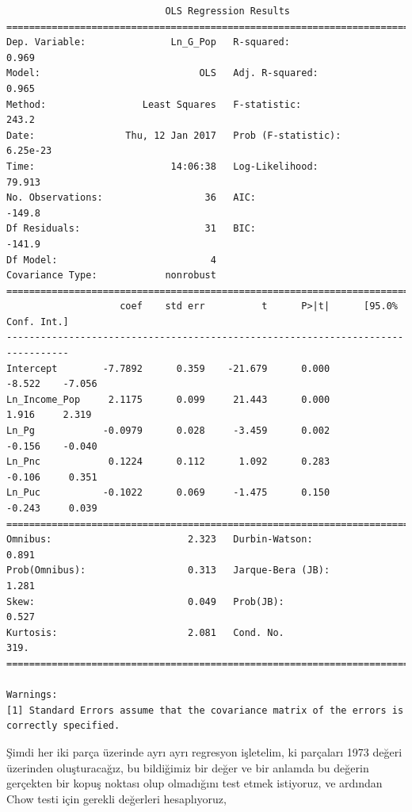 \documentclass[12pt,fleqn]{article}\usepackage{../../common}
\begin{document}
\begin{verbatim}
                            OLS Regression Results                            
==============================================================================
Dep. Variable:               Ln_G_Pop   R-squared:                       0.969
Model:                            OLS   Adj. R-squared:                  0.965
Method:                 Least Squares   F-statistic:                     243.2
Date:                Thu, 12 Jan 2017   Prob (F-statistic):           6.25e-23
Time:                        14:06:38   Log-Likelihood:                 79.913
No. Observations:                  36   AIC:                            -149.8
Df Residuals:                      31   BIC:                            -141.9
Df Model:                           4                                         
Covariance Type:            nonrobust                                         
=================================================================================
                    coef    std err          t      P>|t|      [95.0% Conf. Int.]
---------------------------------------------------------------------------------
Intercept        -7.7892      0.359    -21.679      0.000        -8.522    -7.056
Ln_Income_Pop     2.1175      0.099     21.443      0.000         1.916     2.319
Ln_Pg            -0.0979      0.028     -3.459      0.002        -0.156    -0.040
Ln_Pnc            0.1224      0.112      1.092      0.283        -0.106     0.351
Ln_Puc           -0.1022      0.069     -1.475      0.150        -0.243     0.039
==============================================================================
Omnibus:                        2.323   Durbin-Watson:                   0.891
Prob(Omnibus):                  0.313   Jarque-Bera (JB):                1.281
Skew:                           0.049   Prob(JB):                        0.527
Kurtosis:                       2.081   Cond. No.                         319.
==============================================================================

Warnings:
[1] Standard Errors assume that the covariance matrix of the errors is correctly specified.
\end{verbatim}

Şimdi her iki parça üzerinde ayrı ayrı regresyon işletelim, ki parçaları
1973 değeri üzerinden oluşturacağız, bu bildiğimiz bir değer ve bir anlamda
bu değerin gerçekten bir kopuş noktası olup olmadığını test etmek
istiyoruz, ve ardından Chow testi için gerekli değerleri hesaplıyoruz,
\end{document}
